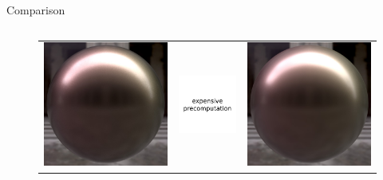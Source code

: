 \documentclass[final]{beamer}
\newlength{\onecolwid}
\newlength{\twocolwid}
\begin{document}
\begin{frame}[t]
\begin{columns}[t]
\begin{column}{\twocolwid}
\begin{block}{Comparison}
\begin{columns}[t,totalwidth=\twocolwid]
\begin{column}{\onecolwid}
\begin{figure}
\begin{tabular}{ccc}
                    	    \includegraphics[width=0.32\columnwidth]{validations/compare2/sphere_layered_1024spp_37min.jpg} &
                    	    \includegraphics[width=0.32\columnwidth]{validations/compare2/na2.pdf} &
                    	    \includegraphics[width=0.32\columnwidth]{validations/compare2/sphere_laurent_1024spp_1_5min.jpg} \\
                    

\end{tabular}
\end{figure}
\end{column}
\end{columns}
\end{block}
\end{column}
\end{columns}
\end{frame}
\end{document}
